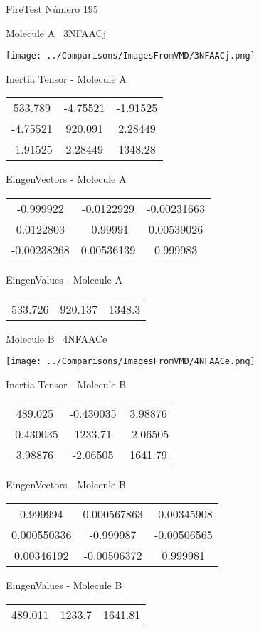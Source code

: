 \vtab[-3cm]
\begin{center}
{\large FireTest \tab Número 195}
\end{center}
\begin{multicols}{2}
\begin{center}

Molecule A \
3NFAACj

\texttt{[image: ../Comparisons/ImagesFromVMD/3NFAACj.png]}

Inertia Tensor - Molecule A \\
\begin{tabular}{|c c c|}
533.789	 & 	-4.75521	 & 	-1.91525	 \\
-4.75521	 & 	920.091	 & 	2.28449	 \\
-1.91525	 & 	2.28449	 & 	1348.28
\end{tabular}

\vtab
 EingenVectors - Molecule A     \\
\begin{tabular}{|c c c|}
-0.999922	 & 	-0.0122929	 & 	-0.00231663	 \\
0.0122803	 & 	-0.99991	 & 	0.00539026	 \\
-0.00238268	 & 	0.00536139	 & 	0.999983
\end{tabular}

\vtab
 EingenValues - Molecule A     \\
\begin{tabular}{|c c c|}
533.726	 & 	920.137	 & 	1348.3	 \\
\end{tabular}
\columnbreak

Molecule B \
4NFAACe

\texttt{[image: ../Comparisons/ImagesFromVMD/4NFAACe.png]}

Inertia Tensor - Molecule B \\
\begin{tabular}{|c c c|}
489.025	 & 	-0.430035	 & 	3.98876	 \\
-0.430035	 & 	1233.71	 & 	-2.06505	 \\
3.98876	 & 	-2.06505	 & 	1641.79
\end{tabular}

\vtab
 EingenVectors - Molecule B     \\
\begin{tabular}{|c c c|}
0.999994	 & 	0.000567863	 & 	-0.00345908	 \\
0.000550336	 & 	-0.999987	 & 	-0.00506565	 \\
0.00346192	 & 	-0.00506372	 & 	0.999981
\end{tabular}

\vtab
 EingenValues - Molecule B     \\
\begin{tabular}{|c c c|}
489.011	 & 	1233.7	 & 	1641.81	 \\
\end{tabular}

\end{center}
\end{multicols}

